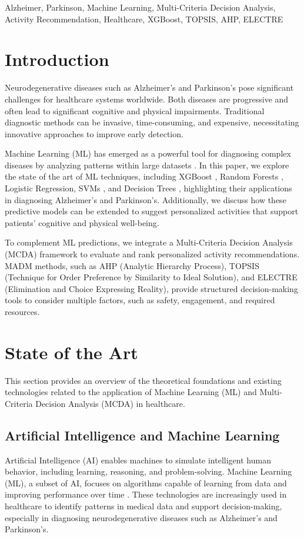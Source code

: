 \documentclass[conference]{IEEEtran}
\begin{document}
\begin{IEEEkeywords}
Alzheimer, Parkinson, Machine Learning, Multi-Criteria Decision Analysis, Activity Recommendation, Healthcare, XGBoost, TOPSIS, AHP, ELECTRE
\end{IEEEkeywords}

\section{Introduction}
Neurodegenerative diseases such as Alzheimer’s and Parkinson’s pose significant challenges for healthcare systems worldwide. Both diseases are progressive and often lead to significant cognitive and physical impairments. Traditional diagnostic methods can be invasive, time-consuming, and expensive, necessitating innovative approaches to improve early detection.

Machine Learning (ML) has emerged as a powerful tool for diagnosing complex diseases by analyzing patterns within large datasets \cite{b1}. In this paper, we explore the state of the art of ML techniques, including XGBoost \cite{b1}, Random Forests \cite{b2}, Logistic Regression, SVMs \cite{b3}, and Decision Trees \cite{b7}, highlighting their applications in diagnosing Alzheimer’s and Parkinson’s. Additionally, we discuss how these predictive models can be extended to suggest personalized activities that support patients' cognitive and physical well-being.

To complement ML predictions, we integrate a Multi-Criteria Decision Analysis (MCDA) framework to evaluate and rank personalized activity recommendations. MADM methods, such as AHP (Analytic Hierarchy Process), TOPSIS (Technique for Order Preference by Similarity to Ideal Solution), and ELECTRE (Elimination and Choice Expressing Reality), provide structured decision-making tools to consider multiple factors, such as safety, engagement, and required resources.

\section{State of the Art}
This section provides an overview of the theoretical foundations and existing technologies related to the application of Machine Learning (ML) and Multi-Criteria Decision Analysis (MCDA) in healthcare.

\subsection{Artificial Intelligence and Machine Learning}
Artificial Intelligence (AI) enables machines to simulate intelligent human behavior, including learning, reasoning, and problem-solving. Machine Learning (ML), a subset of AI, focuses on algorithms capable of learning from data and improving performance over time \cite{b1}. These technologies are increasingly used in healthcare to identify patterns in medical data and support decision-making, especially in diagnosing neurodegenerative diseases such as Alzheimer’s and Parkinson’s.
\end{document}
